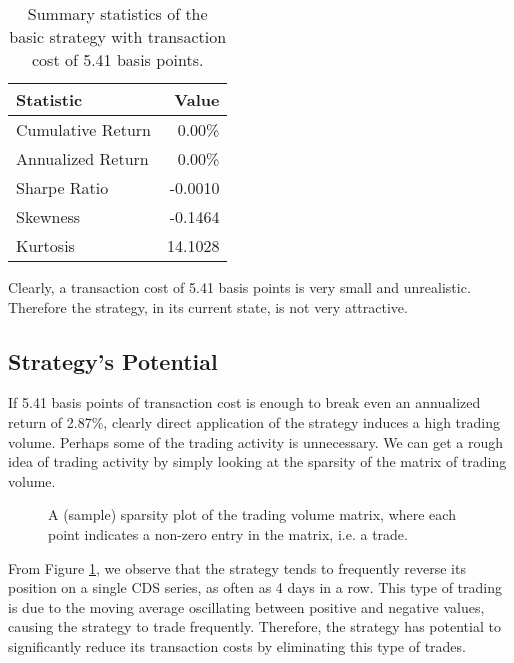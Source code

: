 \documentclass[11pt]{article}
\theoremstyle{definition}
\begin{document}
\begin{table}[h]
\centering
\begin{tabular}{ | l | r | }
  \hline      
  Statistic & Value \\
  \hline
  Cumulative Return & 0.00\% \\
  Annualized Return & 0.00\% \\
  Sharpe Ratio & -0.0010 \\
  Skewness & -0.1464 \\
  Kurtosis & 14.1028 \\
  \hline  
\end{tabular}
\caption{Summary statistics of the basic strategy
  with transaction cost of 5.41 basis points.}
\label{tab:summary2}
\end{table}

Clearly, a transaction cost of 5.41 basis points 
is very small and unrealistic.
Therefore the strategy, in its current state,
is not very attractive.









\subsection{Strategy's Potential}

If 5.41 basis points of transaction cost
is enough to break even an annualized return of 2.87\%, 
clearly direct application of the strategy 
induces a high trading volume.
Perhaps some of the trading activity is unnecessary.
We can get a rough idea of trading activity 
by simply looking at the sparsity of 
the matrix of trading volume.

\begin{figure}[h!]
\begin{center}
\end{center}
\centering
\caption{\label{fg:spy_volume}
A (sample) sparsity plot of the trading volume matrix,
where each point indicates a non-zero entry
in the matrix, i.e. a trade.
}
\end{figure}

From Figure \ref{fg:spy_volume}, 
we observe that the strategy tends to 
frequently reverse its position on a single CDS series,
as often as 4 days in a row.
This type of trading is due to the moving average 
oscillating between positive and negative values, 
causing the strategy to trade frequently.
Therefore, the strategy has potential to 
significantly reduce its transaction costs
by eliminating this type of trades.
\end{document}
